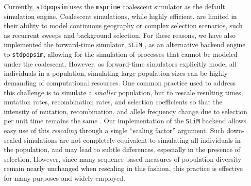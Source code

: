 \documentclass[12pt,halfline,a4paper]{ouparticle}
\newcommand{\stdpopsim}{\texttt{stdpopsim}\xspace}
\begin{document}
Currently, \stdpopsim uses the  \texttt{msprime} coalescent simulator \citep{kelleher2016efficient}
as the default simulation engine.
Coalescent simulations, while highly efficient, are limited in their ability to model
continuous geography or
complex selection scenarios, such as recurrent sweeps and background selection.
For these reasons,
we have also implemented the forward-time simulator, \texttt{SLiM} \citep{haller2019tree,haller2019slim},
as an alternative backend engine to \texttt{stdpopsim}, allowing for the simulation of processes that cannot be modeled under
the coalescent. However, as forward-time simulators explicitly model all individuals in a population, simulating large
population sizes can be highly demanding of computational resources. One common practice used to address this challenge is to
simulate a \emph{smaller} population, but to rescale resulting times,
mutation rates, recombination rates, and selection coefficients
so that the intensity of mutation, recombination, and allele frequency change due to selection
per unit time remains the same
\citep[see the \texttt{SLiM} manual and][]{uricchio2014robust}.
Our implementation of the \texttt{SLiM} backend allows easy use of this \emph{rescaling}
through a single ``scaling factor'' argument.
Such down-scaled simulations are not completely equivalent to simulating
all individuals in the population, and may lead to subtle differences,
especially in the presence of selection.
However, since many sequence-based measures of population diversity remain nearly unchanged when rescaling in this fashion,
this practice is effective for many purposes and widely employed.
\end{document}
